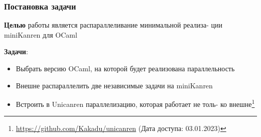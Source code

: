 \documentclass[aspectratio=169]{beamer}
\begin{document}
\begin{frame}
	\frametitle{Постановка задачи}
	\textbf{Целью} работы является распараллеливание минимальной реализа-
	ции miniKanren для OCaml %

	\textbf{Задачи}:
	\begin{itemize}
		\item Выбрать версию OCaml, на которой будет реализована параллельность
		\item Внешне распараллелить две независимые задачи на miniKanren
		\item Встроить в Unicanren параллелизацию, которая работает не толь-
		      ко внешне\footnote{\url{https://github.com/Kakadu/unicanren} (Дата доступа: 03.01.2023)}
	\end{itemize}
\end{frame}




\end{document}
